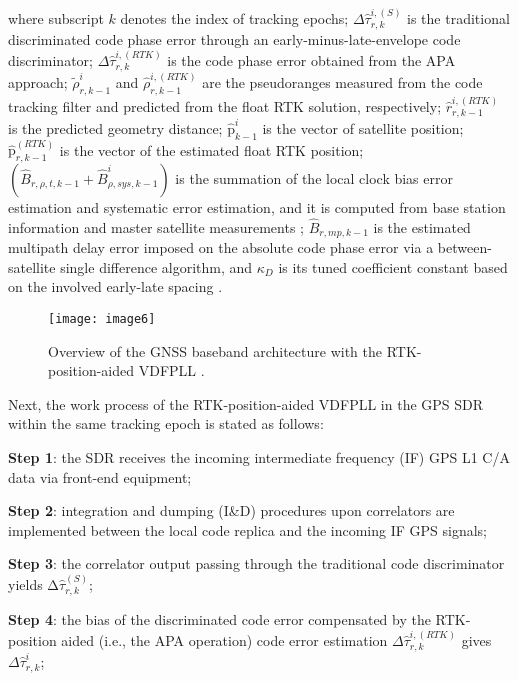 \documentclass{article}
\begin{document}
where subscript $k$ denotes the index of tracking epochs; $\Delta{\hat{\tau}}^{i,\left(S\right)}_{r,k}$ is the traditional discriminated code phase error through an early-minus-late-envelope code discriminator; $\Delta{\hat{\tau}}^{i,\left(RTK\right)}_{r,k}$ is the code phase error obtained from the APA approach; ${\tilde{\rho}}^i_{r,k-1}$ and ${\hat{\rho}}^{i,\left(RTK\right)}_{r,k-1}$ are the pseudoranges measured from the code tracking filter and predicted from the float RTK solution, respectively; ${\hat{r}}^{i,\left(RTK\right)}_{r,k-1}$ is the predicted geometry distance; ${\hat{\boldsymbol{\mathrm{p}}}}^i_{k-1}$ is the vector of satellite position; ${\hat{\boldsymbol{\mathrm{p}}}}^{\left(RTK\right)}_{r,k-1}$ is the vector of the estimated float RTK position; $\left({\hat{B}}_{r,\rho ,t,k-1}+{\hat{B}}^i_{\rho ,sys,k-1}\right)$ is the summation of the local clock bias error estimation and systematic error estimation, and it is computed from base station information and master satellite measurements \cite{Luo2022aa}; ${\hat{B}}_{r,mp,k-1}$ is the estimated multipath delay error imposed on the absolute code phase error via a between-satellite single difference algorithm, and ${\kappa }_D$ is its tuned coefficient constant based on the involved early-late spacing \cite{Luo2021apa}.

\begin{figure}[htbp]%
\centerline{\texttt{[image: image6]}}
\caption{Overview of the GNSS baseband architecture with the RTK-position-aided VDFPLL \cite{Luo2022aa,Luo2021apa}.}
\label{fig:fig3}
\end{figure}

Next, the work process of the RTK-position-aided VDFPLL in the GPS SDR within the same tracking epoch is stated as follows:

\textbf{Step 1}: the SDR receives the incoming intermediate frequency (IF) GPS L1 C/A data via front-end equipment; 

\textbf{Step 2}: integration and dumping (I\&D) procedures upon correlators are implemented between the local code replica and the incoming IF GPS signals; 

\textbf{Step 3}: the correlator output passing through the traditional code discriminator yields $\mathrm{\Delta }{\hat{\tau }}^{\left(S\right)}_{r,k}$;  

\textbf{Step 4}: the bias of the discriminated code error compensated by the RTK-position aided (i.e., the APA operation) code error estimation $\Delta{\hat{\tau}}^{i,\left(RTK\right)}_{r,k}$ gives $\Delta{\hat{\tau}}^i_{r,k}$; 
\end{document}
